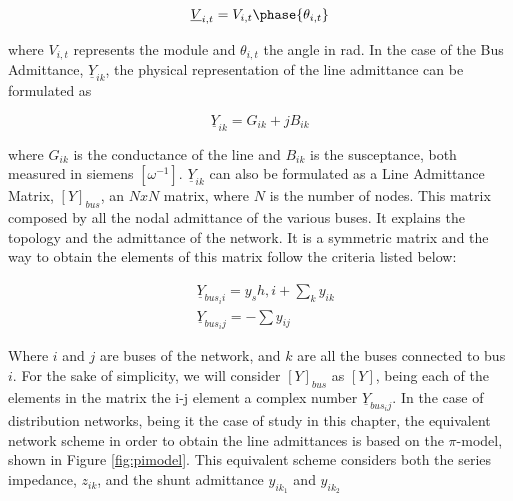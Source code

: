 \begin{equation}
\underline{V}_{i,t} = V_{i,t} \phase{\theta_{i,t}}
\end{equation}

where $V_{i,t}$ represents the module and $\theta_{i,t}$ the angle in rad. In the case of the Bus Admittance, $\underline{Y}_{ik}$, the physical representation of the line admittance can be formulated as

\begin{equation}
\underline{Y}_{ik} = G_{ik} + jB_{ik}
\end{equation}

where $G_{ik}$ is the conductance of the line and $B_{ik}$ is the susceptance, both measured in siemens $[\omega^{-1}]$. $\underline{Y}_{ik}$ can also be formulated as a Line Admittance Matrix, $[Y]_{bus}$, an $N x N$ matrix, where $N$ is the number of nodes. This matrix composed by all the nodal admittance of the various buses. It explains the topology and the admittance of the network. It is a symmetric matrix and the way to obtain the elements of this matrix follow the criteria listed below:

\begin{subequations}
\begin{align*}
& \underline{Y}_{bus_ii}= y_sh,i + \sum_k y_{ik} \\
& \underline{Y}_{bus_ij} = - \sum y_{ij}
\end{align*}
\end{subequations}

Where $i$ and $j$ are buses of the network, and $k$ are all the buses connected to bus $i$. For the sake of simplicity, we will consider $[Y]_{bus}$ as $[Y]$, being each of the elements in the matrix the i-j element a complex number $\underline{Y}_{bus_ij}$. In the case of distribution networks, being it the case of study in this chapter, the equivalent network scheme in order to obtain the line admittances is based on the $\pi$-model, shown in Figure \ref{fig:pimodel}. This equivalent scheme considers both the series impedance, $z_{ik}$, and the shunt admittance $y_{ik_1}$ and $y_{ik_2}$ 

